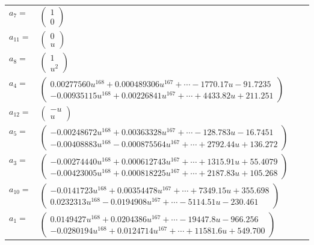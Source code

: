 \documentclass[1p]{elsarticle_modified}
\theoremstyle{definition}
\begin{document}
\begin{tabular}{m{7pt} m{180pt} m{7pt} m{180pt} }
\flushright $a_{7}=$&$\begin{pmatrix}1\\0\end{pmatrix}$ \\
\flushright $a_{11}=$&$\begin{pmatrix}0\\u\end{pmatrix}$ \\
\flushright $a_{8}=$&$\begin{pmatrix}1\\u^2\end{pmatrix}$ \\
\flushright $a_{4}=$&$\begin{pmatrix}0.00277560 u^{168}+0.000489306 u^{167}+\cdots-1770.17 u-91.7235\\-0.00935115 u^{168}+0.00226841 u^{167}+\cdots+4433.82 u+211.251\end{pmatrix}$ \\
\flushright $a_{12}=$&$\begin{pmatrix}- u\\u\end{pmatrix}$ \\
\flushright $a_{5}=$&$\begin{pmatrix}-0.00248672 u^{168}+0.00363328 u^{167}+\cdots-128.783 u-16.7451\\-0.00408883 u^{168}-0.000875564 u^{167}+\cdots+2792.44 u+136.272\end{pmatrix}$ \\
\flushright $a_{3}=$&$\begin{pmatrix}-0.00274440 u^{168}+0.000612743 u^{167}+\cdots+1315.91 u+55.4079\\-0.00423005 u^{168}+0.000818225 u^{167}+\cdots+2187.83 u+105.268\end{pmatrix}$ \\
\flushright $a_{10}=$&$\begin{pmatrix}-0.0141723 u^{168}+0.00354478 u^{167}+\cdots+7349.15 u+355.698\\0.0232313 u^{168}-0.0194908 u^{167}+\cdots-5114.51 u-230.461\end{pmatrix}$ \\
\flushright $a_{1}=$&$\begin{pmatrix}0.0149427 u^{168}+0.0204386 u^{167}+\cdots-19447.8 u-966.256\\-0.0280194 u^{168}+0.0124714 u^{167}+\cdots+11581.6 u+549.700\end{pmatrix}$ \\

\end{tabular}
\end{document}
